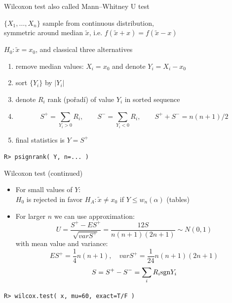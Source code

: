\documentclass[smaller]{beamer}
\def\sgn{{\rm sgn}}
\def\abs#1{\lvert#1\rvert}
\def\blue#1{{\usebeamercolor[fg]{my blue} #1}}
\def\xskip{{\vspace{2ex}}}
\def\cz#1{{\small (#1)}}
\begin{document}
\begin{frame}[fragile]{Wilcoxon test}
also called \blue{Mann–Whitney U test}

\xskip
$\{X_1,\dots,X_n\}$ sample from continuous distribution,\\
\blue{symmetric} around median $\tilde{x}$, i.e. $f(\tilde{x} + x) = f(\tilde{x} -x)$

\xskip
$H_0: \tilde{x} = x_0$, and classical three alternatives

\xskip
\begin{enumerate}
 \item remove median values: $X_i = x_0$ and denote $Y_i = X_i - x_0$
 \item sort $\{Y_i\}$ by $\abs{Y_i}$
 \item denote $R_i$ rank \cz{pořadí} of value $Y_i$ in sorted sequence
 \item \[
          S^+ = \sum_{Y_i >0} R_i,\qquad  S^- = \sum_{Y_i <0} R_i,\qquad S^+ + S^- = n(n+1)/2
       \]
 \item final statistics is $Y = S^+$
 
\end{enumerate}

\verb'R> psignrank( Y, n=... )'
\end{frame}


\begin{frame}[fragile]{Wilcoxon test (continued)}
 \begin{itemize}
  \item For small values of $Y$:\\
   $H_0$ is rejected in favor $H_A: \tilde{x} \ne x_0$ if $Y \le w_n(\alpha)$ (tables)
  \item For larger $n$ we can use approximation:
  \[
    U = \frac{S^+ - ES^+}{\sqrt{var S^+}} = \frac{12 S}{n(n+1)(2n+1)} \sim N(0,1)
  \]
with mean value and variance:
  \[
    ES^+ = \frac{1}{4}n(n+1),\quad var S^+ = \frac{1}{24}n(n+1)(2n+1)
  \]
  \[
    S = S^+ - S^- = \sum_{i} R_i \sgn Y_i
  \]
 \end{itemize}
 \verb'R> wilcox.test( x, mu=60, exact=T/F )'
\end{frame}
\end{document}
